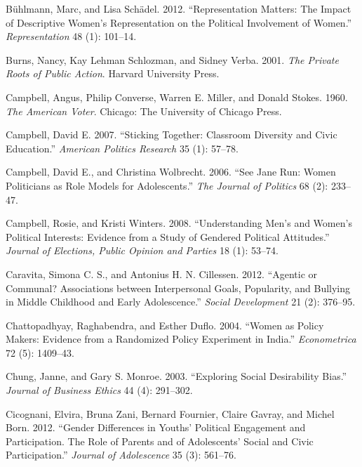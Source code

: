\documentclass[
  letterpaper,
  DIV=11,
  numbers=noendperiod]{scrreprt}
\newlength{\cslhangindent}
\newenvironment{CSLReferences}[2] %
 {\begin{list}{}{%
  \setlength{\itemindent}{0pt}
  \setlength{\leftmargin}{0pt}
  \setlength{\parsep}{0pt}
  \ifodd #1
   \setlength{\leftmargin}{\cslhangindent}
   \setlength{\itemindent}{-1\cslhangindent}
  \fi
  \setlength{\itemsep}{#2\baselineskip}}}
 {\end{list}}
\begin{document}
\begin{CSLReferences}{1}{0}
Bühlmann, Marc, and Lisa Schädel. 2012. {``{Representation Matters: The
Impact of Descriptive Women's Representation on the Political
Involvement of Women}.''} \emph{Representation} 48 (1): 101--14.

Burns, Nancy, Kay Lehman Schlozman, and Sidney Verba. 2001. \emph{{The
Private Roots of Public Action}}. Harvard University Press.

Campbell, Angus, Philip Converse, Warren E. Miller, and Donald Stokes.
1960. \emph{{The American Voter}}. Chicago: The University of Chicago
Press.

Campbell, David E. 2007. {``{Sticking Together: Classroom Diversity and
Civic Education}.''} \emph{American Politics Research} 35 (1): 57--78.

Campbell, David E., and Christina Wolbrecht. 2006. {``{See Jane Run:
Women Politicians as Role Models for Adolescents}.''} \emph{The Journal
of Politics} 68 (2): 233--47.

Campbell, Rosie, and Kristi Winters. 2008. {``{Understanding Men's and
Women's Political Interests: Evidence from a Study of Gendered Political
Attitudes}.''} \emph{Journal of Elections, Public Opinion and Parties}
18 (1): 53--74.

Caravita, Simona C. S., and Antonius H. N. Cillessen. 2012. {``{Agentic
or Communal? Associations between Interpersonal Goals, Popularity, and
Bullying in Middle Childhood and Early Adolescence}.''} \emph{Social
Development} 21 (2): 376--95.

Chattopadhyay, Raghabendra, and Esther Duflo. 2004. {``{Women as Policy
Makers: Evidence from a Randomized Policy Experiment in India}.''}
\emph{Econometrica} 72 (5): 1409--43.

Chung, Janne, and Gary S. Monroe. 2003. {``{Exploring Social
Desirability Bias}.''} \emph{Journal of Business Ethics} 44 (4):
291--302.

Cicognani, Elvira, Bruna Zani, Bernard Fournier, Claire Gavray, and
Michel Born. 2012. {``{Gender Differences in Youths' Political
Engagement and Participation. The Role of Parents and of Adolescents'
Social and Civic Participation}.''} \emph{Journal of Adolescence} 35
(3): 561--76.


\end{CSLReferences}
\end{document}
